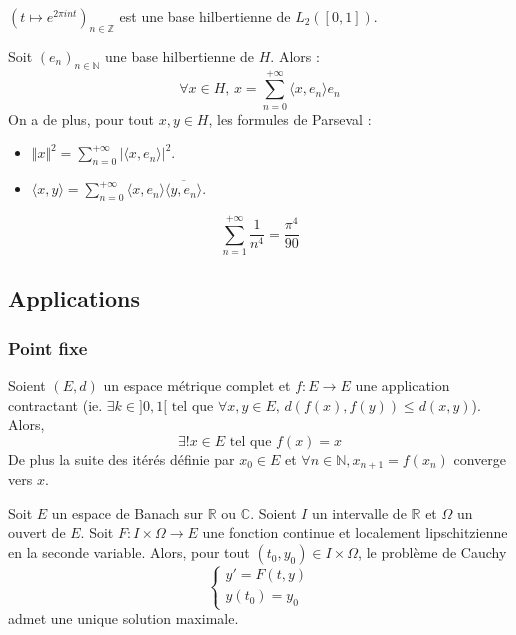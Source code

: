 	\begin{example}
		$(t \mapsto e^{2\pi int})_{n \in \mathbb{Z}}$ est une base hilbertienne de $L_2([0,1])$.
	\end{example}
	
	\begin{theorem}
		Soit $(e_n)_{n \in \mathbb{N}}$ une base hilbertienne de $H$. Alors :
		\[ \forall x \in H, \, x = \sum_{n=0}^{+\infty} \langle x, e_n \rangle e_n \]
		On a de plus, pour tout $x, y \in H$, les formules de Parseval :
		\begin{itemize}
			\item $\Vert x \Vert^2 = \sum_{n=0}^{+\infty} \vert \langle x, e_n \rangle \vert^2$.
			\item $\langle x, y \rangle = \sum_{n=0}^{+\infty} \langle x, e_n \rangle \overline{\langle y, e_n \rangle}$.
		\end{itemize}
	\end{theorem}
	
	
	\begin{application}
		\[ \sum_{n = 1}^{+\infty} \frac{1}{n^4} = \frac{\pi^4}{90} \]
	\end{application}
	
	\subsection{Applications}
	
	\subsubsection{Point fixe}
	
	
	\begin{theorem}
		Soient $(E,d)$ un espace métrique complet et $f : E \rightarrow E$ une application contractant (ie. $\exists k \in ]0,1[ \text{ tel que } \forall x, y \in E, \, d(f(x), f(y)) \leq d(x, y)$). Alors,
		\[ \exists! x \in E \text{ tel que } f(x) = x \]
		De plus la suite des itérés définie par $x_0 \in E$ et $\forall n \in \mathbb{N}, x_{n+1} = f(x_n)$ converge vers $x$.
	\end{theorem}
	
	
	\begin{application}
		Soit $E$ un espace de Banach sur $\mathbb{R}$ ou $\mathbb{C}$. Soient $I$ un intervalle de $\mathbb{R}$ et $\Omega$ un ouvert de $E$. Soit $F : I \times \Omega \rightarrow E$ une fonction continue et localement lipschitzienne en la seconde variable. Alors, pour tout $(t_0, y_0) \in I \times \Omega$, le problème de Cauchy
		\[ \begin{cases} y'=F(t,y) \\ y(t_0) = y_0 \end{cases} \tag{$C$} \]
		admet une unique solution maximale.
	\end{application}
	
